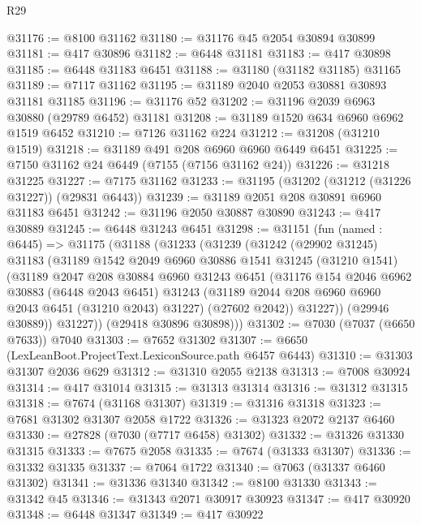 \begin{lexlean}{R29}
\begin{coremodule}
@31176 := @8100 @31162
@31180 := @31176 @45 @2054 @30894 @30899
@31181 := @417 @30896
@31182 := @6448 @31181
@31183 := @417 @30898
@31185 := @6448 @31183 @6451
@31188 := @31180 (@31182 @31185) @31165
@31189 := @7117 @31162
@31195 := @31189 @2040 @2053 @30881 @30893 @31181 @31185
@31196 := @31176 @52
@31202 := @31196 @2039 @6963 @30880 (@29789 @6452) @31181
@31208 := @31189 @1520 @634 @6960 @6962 @1519 @6452
@31210 := @7126 @31162 @224
@31212 := @31208 (@31210 @1519)
@31218 := @31189 @491 @208 @6960 @6960 @6449 @6451
@31225 := @7150 @31162 @24 @6449 (@7155 (@7156 @31162 @24))
@31226 := @31218 @31225
@31227 := @7175 @31162
@31233 := @31195 (@31202 (@31212 (@31226 @31227)) (@29831 @6443))
@31239 := @31189 @2051 @208 @30891 @6960 @31183 @6451
@31242 := @31196 @2050 @30887 @30890
@31243 := @417 @30889
@31245 := @6448 @31243 @6451
@31298 := @31151
    (fun (named : @6445) =>
    @31175
      (@31188
        (@31233
          (@31239
            (@31242
              (@29902 @31245)
              @31183
              (@31189
                @1542
                @2049
                @6960
                @30886
                @1541
                @31245
                (@31210 @1541)
                (@31189
                  @2047
                  @208
                  @30884
                  @6960
                  @31243
                  @6451
                  (@31176
                    @154
                    @2046
                    @6962
                    @30883
                    (@6448 @2043 @6451)
                    @31243
                    (@31189 @2044 @208 @6960 @6960 @2043 @6451 (@31210 @2043) @31227)
                    (@27602 @2042))
                  @31227))
              (@29946 @30889))
            @31227))
        (@29418 @30896 @30898)))
@31302 := @7030 (@7037 (@6650 @7633)) @7040
@31303 := @7652 @31302
@31307 := @6650 (LexLeanBoot.ProjectText.LexiconSource.path @6457 @6443)
@31310 := @31303 @31307 @2036 @629
@31312 := @31310 @2055 @2138
@31313 := @7008 @30924
@31314 := @417 @31014
@31315 := @31313 @31314
@31316 := @31312 @31315
@31318 := @7674 (@31168 @31307)
@31319 := @31316 @31318
@31323 := @7681 @31302 @31307 @2058 @1722
@31326 := @31323 @2072 @2137 @6460
@31330 := @27828 (@7030 (@7717 @6458) @31302)
@31332 := @31326 @31330 @31315
@31333 := @7675 @2058
@31335 := @7674 (@31333 @31307)
@31336 := @31332 @31335
@31337 := @7064 @1722
@31340 := @7063 (@31337 @6460 @31302)
@31341 := @31336 @31340
@31342 := @8100 @31330
@31343 := @31342 @45
@31346 := @31343 @2071 @30917 @30923
@31347 := @417 @30920
@31348 := @6448 @31347
@31349 := @417 @30922

\end{coremodule}
\end{lexlean}
